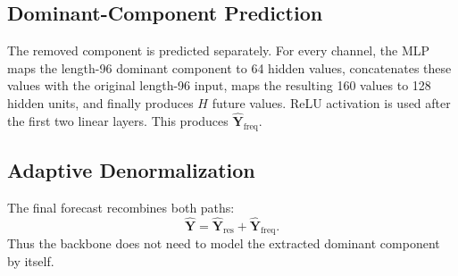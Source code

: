 \documentclass[conference,10pt]{IEEEtran}
\begin{document}
\subsection{Dominant-Component Prediction}
The removed component is predicted separately. For every channel, the MLP maps the length-96 dominant component to 64 hidden values, concatenates these values with the original length-96 input, maps the resulting 160 values to 128 hidden units, and finally produces $H$ future values. ReLU activation is used after the first two linear layers. This produces
$\widehat{\mathbf{Y}}_{\mathrm{freq}}$.

\subsection{Adaptive Denormalization}
The final forecast recombines both paths:
\begin{equation}
\widehat{\mathbf{Y}}=
\widehat{\mathbf{Y}}_{\mathrm{res}}+
\widehat{\mathbf{Y}}_{\mathrm{freq}}.
\label{eq:combine}
\end{equation}
Thus the backbone does not need to model the extracted dominant component by itself.
\end{document}
